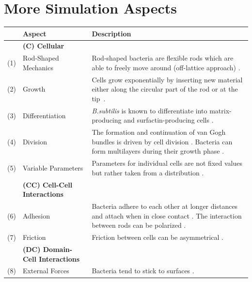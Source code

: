 \documentclass{article}
\begin{document}
\section{More Simulation Aspects}
\label{section:supplement-more-simulation-aspects}
\begin{table}[H]
    \centering
    \def\arraystretch{1.3}
    \begin{tabularx}{\textwidth}{c l X}
        &\textbf{Aspect} & \textbf{Description}\\
        \toprule
        &\textbf{(C) Cellular}\\
        \midrule
        (1) & Rod-Shaped Mechanics &
            Rod-shaped bacteria are flexible rods which are able to freely move around (off-lattice
            approach) \cite{Takeuchi2005,Ursell2014,Amir2014_2}.\\
        (2) & Growth &
            Cells grow exponentially by inserting new material either along the circular part of the
            rod or at the tip~\cite{Robert2014,Takeuchi2005}.\\
        (3) & Differentiation &
            \textit{B.subtilis} is known to differentiate into matrix-producing and
            surfactin-producing cells \cite{vanGestel2015,Lpez2010}.\\
        (4) & Division &
            The formation and continuation of van Gogh bundles is driven by cell division
            \cite{vanGestel2015}.
            Bacteria can form multilayers during their growth phase \cite{Duvernoy2018}.\\
        (5) & Variable Parameters &
            Parameters for individual cells are not fixed values but rather taken from a
            distribution \cite{Koutsoumanis2013}.\\
        &\textbf{(CC) Cell-Cell Interactions}\\
        \midrule
        (6) & Adhesion &
            Bacteria adhere to each other at longer distances and attach when in close contact
            \cite{Verwey1947,Trejo2013}.
            The interaction between rods can be polarized \cite{Duvernoy2018}.\\
        (7) & Friction &
            Friction between cells \cite{Grant2014} can be asymmetrical \cite{Doumic2020}.\\
        &\textbf{(DC) Domain-Cell Interactions}\\
        \midrule
        (8) & External Forces &
            Bacteria tend to stick to surfaces \cite{vanLoosdrecht1989}.

\end{tabularx}
\end{table}
\end{document}
